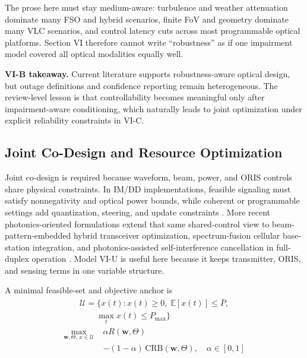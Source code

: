 \documentclass[letterpaper,journal]{IEEEtran}
\begin{document}
The prose here must stay medium-aware: turbulence and weather attenuation dominate many FSO and hybrid scenarios, finite FoV and geometry dominate many VLC scenarios, and control latency cuts across most programmable optical platforms. Section VI therefore cannot write ``robustness'' as if one impairment model covered all optical modalities equally well.

\textbf{VI-B takeaway.} Current literature supports robustness-aware optical design, but outage definitions and confidence reporting remain heterogeneous. The review-level lesson is that controllability becomes meaningful only after impairment-aware conditioning, which naturally leads to joint optimization under explicit reliability constraints in VI-C.

\subsection{Joint Co-Design and Resource Optimization}

Joint co-design is required because waveform, beam, power, and ORIS controls share physical constraints. In IM/DD implementations, feasible signaling must satisfy nonnegativity and optical power bounds, while coherent or programmable settings add quantization, steering, and update constraints \cite{O_ISAC_009,O_ISAC_023,O_ISAC_054,O_ISAC_061,O_ISAC_091,O_ISAC_127}. More recent photonics-oriented formulations extend that same shared-control view to beam-pattern-embedded hybrid transceiver optimization, spectrum-fusion cellular base-station integration, and photonics-assisted self-interference cancellation in full-duplex operation \cite{O_ISAC_206,O_ISAC_280,O_ISAC_283}. Model VI-U is useful here because it keeps transmitter, ORIS, and sensing terms in one variable structure.

A minimal feasible-set and objective anchor is
\begin{equation}
    \begin{split}
        \mathcal U=\{x(t):x(t)\ge 0,\;\mathbb{E}[x(t)]\le \bar P, \\
        \qquad \max_t x(t)\le P_{\max}\}
    \end{split}
\end{equation}
\begin{equation}
    \begin{split}
        \max_{\mathbf{w},\Theta,\,x\in\mathcal U}\; & \alpha R(\mathbf{w},\Theta)                                       \\
                                                    & -(1-\alpha)\,\mathrm{CRB}(\mathbf{w},\Theta),\quad \alpha\in[0,1]
    \end{split}
\end{equation}
\end{document}
